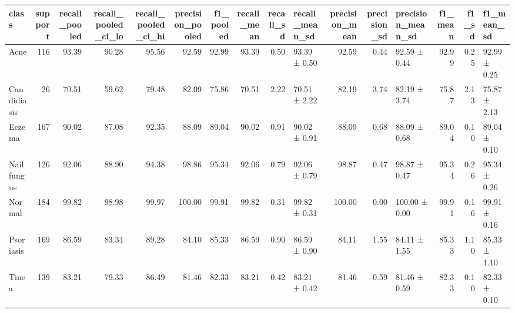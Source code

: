 \begin{tabular}{lrrrrrrrrlrrlrrl}
\toprule
class & support & recall\_pooled & recall\_pooled\_ci\_lo & recall\_pooled\_ci\_hi & precision\_pooled & f1\_pooled & recall\_mean & recall\_sd & recall\_mean\_sd & precision\_mean & precision\_sd & precision\_mean\_sd & f1\_mean & f1\_sd & f1\_mean\_sd \\
\midrule
Acne & 116 & 93.39 & 90.28 & 95.56 & 92.59 & 92.99 & 93.39 & 0.50 & 93.39 ± 0.50 & 92.59 & 0.44 & 92.59 ± 0.44 & 92.99 & 0.25 & 92.99 ± 0.25 \\
Candidiasis & 26 & 70.51 & 59.62 & 79.48 & 82.09 & 75.86 & 70.51 & 2.22 & 70.51 ± 2.22 & 82.19 & 3.74 & 82.19 ± 3.74 & 75.87 & 2.13 & 75.87 ± 2.13 \\
Eczema & 167 & 90.02 & 87.08 & 92.35 & 88.09 & 89.04 & 90.02 & 0.91 & 90.02 ± 0.91 & 88.09 & 0.68 & 88.09 ± 0.68 & 89.04 & 0.10 & 89.04 ± 0.10 \\
Nail fungus & 126 & 92.06 & 88.90 & 94.38 & 98.86 & 95.34 & 92.06 & 0.79 & 92.06 ± 0.79 & 98.87 & 0.47 & 98.87 ± 0.47 & 95.34 & 0.26 & 95.34 ± 0.26 \\
Normal & 184 & 99.82 & 98.98 & 99.97 & 100.00 & 99.91 & 99.82 & 0.31 & 99.82 ± 0.31 & 100.00 & 0.00 & 100.00 ± 0.00 & 99.91 & 0.16 & 99.91 ± 0.16 \\
Psoriasis & 169 & 86.59 & 83.34 & 89.28 & 84.10 & 85.33 & 86.59 & 0.90 & 86.59 ± 0.90 & 84.11 & 1.55 & 84.11 ± 1.55 & 85.33 & 1.10 & 85.33 ± 1.10 \\
Tinea & 139 & 83.21 & 79.33 & 86.49 & 81.46 & 82.33 & 83.21 & 0.42 & 83.21 ± 0.42 & 81.46 & 0.59 & 81.46 ± 0.59 & 82.33 & 0.10 & 82.33 ± 0.10 \\
\bottomrule
\end{tabular}
